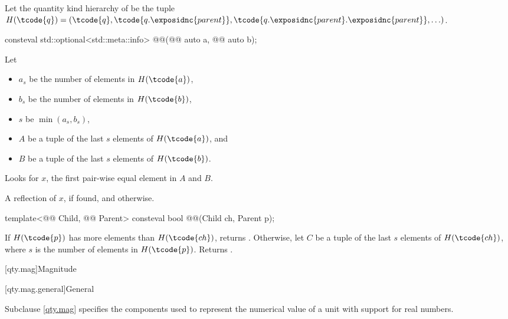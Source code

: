 \pnum
Let the quantity kind hierarchy of  be the tuple
$H(\tcode{q}) = ( \tcode{q}, \tcode{q.\exposidnc{parent}}, \tcode{q.\exposidnc{parent}.\exposidnc{parent}}, \ldots )$.

\begin{itemdecl}
consteval std::optional<std::meta::info> @@(@@ auto a,
                                                         @@ auto b);
\end{itemdecl}

\begin{itemdescr}
\pnum
Let
\begin{itemize}
\item
$a_s$ be the number of elements in $H(\tcode{a})$,
\item
$b_s$ be the number of elements in $H(\tcode{b})$,
\item
$s$ be $\operatorname{min}(a_s, b_s)$,
\item
$A$ be a tuple of the last $s$ elements of $H(\tcode{a})$, and
\item
$B$ be a tuple of the last $s$ elements of $H(\tcode{b})$.
\end{itemize}

\pnum
\effects
Looks for $x$, the first pair-wise equal element in $A$ and $B$.

\pnum
\returns
A reflection of $x$, if found, and  otherwise.
\end{itemdescr}

\begin{itemdecl}
template<@@ Child, @@ Parent>
consteval bool @@(Child ch, Parent p);
\end{itemdecl}

\begin{itemdescr}
\pnum
\returns
If $H(\tcode{p})$ has more elements than $H(\tcode{ch})$, returns .
Otherwise, let $C$ be a tuple of the last $s$ elements of $H(\tcode{ch})$,
where $s$ is the number of elements in $H(\tcode{p})$.
Returns .
\end{itemdescr}

[qty.mag]{Magnitude}

[qty.mag.general]{General}

Subclause \ref{qty.mag} specifies the components
used to represent the numerical value of a unit
with support for real numbers.

